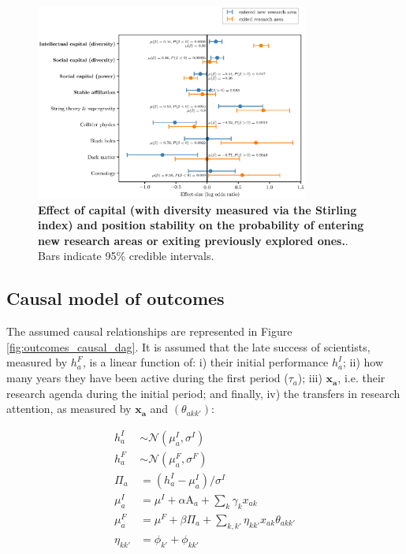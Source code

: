 \documentclass{article}
\begin{document}
\begin{figure}[H]
    \centering
    \includegraphics[width=0.8\textwidth]{plots/exited_score_effects_stirling_magnitude.eps}
    \caption{\textbf{Effect of capital (with diversity measured via the Stirling index) and position stability on the probability of entering new research areas or exiting previously explored ones.}. Bars indicate 95\% credible intervals.}
    \label{fig:diversification_score_stirling}
\end{figure}



\subsection{\label{appendix:outcomes}Causal model of outcomes}

The assumed causal relationships are represented in Figure \ref{fig:outcomes_causal_dag}. It is assumed that the late success of scientists, measured by $h_a^{F}$, is a linear function of: i) their initial performance $h_a^{I}$; ii) how many years they have been active during the first period ($\tau_a$); iii) $\bm{x_a}$, i.e. their research agenda during the initial period; and finally, iv) the transfers in research attention, as measured by $\bm{x_a}$ and $(\theta_{akk'})$:

\begin{align}
    h_a^{I} &\sim \mathcal{N}(\mu_{a}^I,\sigma^I)\\
    h_a^{F} &\sim \mathcal{N}(\mu_{a}^F ,\sigma^F)\\
    \Pi_a &= (h_a^{I}-\mu_{a}^I)/\sigma^I \\
    \mu_{a}^I &= \mu^I + \alpha \text{A}_a + \sum_{k}\gamma_k x_{ak}\\
    \mu_{a}^F &= \mu^F  + \beta \Pi_a +\sum_{k,k'}\eta_{kk'}x_{ak}\theta_{akk'}\\
    \eta_{kk'} &= \phi_{k'}+\phi_{kk'}
\end{align}
\end{document}
